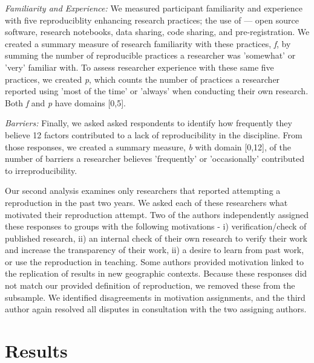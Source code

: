 \documentclass[]{interact}
\theoremstyle{plain}%
\theoremstyle{definition}
\theoremstyle{remark}
\begin{document}
\textit{Familiarity and Experience:} We measured participant familiarity and experience with five reproduciblity enhancing research practices; the use of --- open source software, research notebooks, data sharing, code sharing, and pre-registration. 
We created a summary measure of research familiarity with these practices, \textit{f}, by summing the number of reproducible practices a researcher was 'somewhat' or 'very' familiar with.
To assess researcher experience with these same five practices, we created \textit{p}, which counts the number of practices a researcher reported using 'most of the time' or 'always' when conducting their own research. 
Both \textit{f} and \textit{p} have domains [0,5]. 

\textit{Barriers:} Finally, we asked asked respondents to identify how frequently they believe 12 factors contributed to a lack of reproducibility in the discipline. 
From those responses, we created a summary measure, \textit{b} with domain [0,12], of the number of barriers a researcher believes 'frequently' or 'occasionally' contributed to irreproducibility. 

Our second analysis examines only researchers that reported attempting a reproduction in the past two years. 
We asked each of these researchers what motivated their reproduction attempt. 
Two of the authors independently assigned these responses to groups with the following motivations - i) verification/check of published research, ii) an internal check of their own research to verify their work and increase the transparency of their work, ii) a desire to learn from past work, or use the reproduction in teaching. 
Some authors provided motivation linked to the replication of results in new geographic contexts. 
Because these responses did not match our provided definition of reproduction, we removed these from the subsample. 
We identified disagreements in motivation assignments, and the third author again resolved all disputes in consultation with the two assigning authors. 


\section*{Results}

\end{document}
